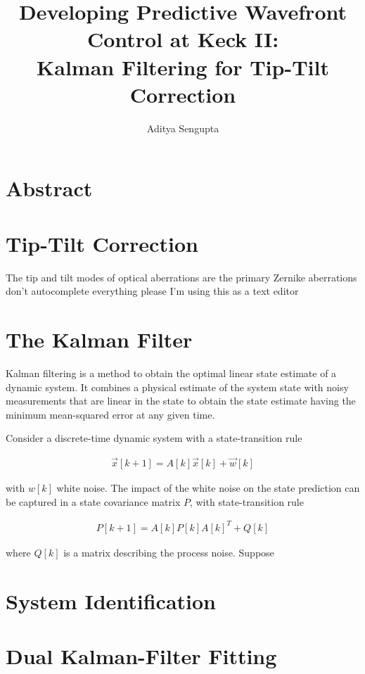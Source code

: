 \documentclass[twocolumn]{article}
\title{Developing Predictive Wavefront Control at Keck II: \\Kalman Filtering for Tip-Tilt Correction}
\author{Aditya Sengupta}
\begin{document}
	\maketitle
	\section*{Abstract}

	\section{Tip-Tilt Correction}

	The tip and tilt modes of optical aberrations are the primary Zernike aberrations don't autocomplete everything please I'm using this as a text editor

	\section{The Kalman Filter}

	Kalman filtering is a method to obtain the optimal linear state estimate of a dynamic system. It combines a physical estimate of the system state with noisy measurements that are linear in the state to obtain the state estimate having the minimum mean-squared error at any given time.

	Consider a discrete-time dynamic system with a state-transition rule

	\begin{align}
		\vec{x}[k + 1] = A[k]\vec{x}[k] + \vec{w}[k]
	\end{align}

	with $w[k]$ white noise. The impact of the white noise on the state prediction can be captured in a state covariance matrix $P$, with state-transition rule

	\begin{align}
		P[k + 1] = A[k]P[k]A[k]^T + Q[k]
	\end{align}

	where $Q[k]$ is a matrix describing the process noise. Suppose 

	\section{System Identification}

	\lipsum[2]

	\section{Dual Kalman-Filter Fitting}

	\lipsum[3]
\end{document}
